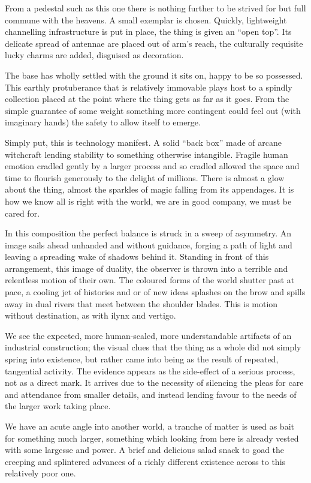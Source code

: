 \documentclass{book}
\begin{document}
From a pedestal such as this one there is nothing further to be strived for but
full commune with the heavens. A small exemplar is chosen. Quickly, lightweight
channelling infrastructure is put in place, the thing is given an ``open top''.
Its delicate spread of antennae are placed out of arm's reach, the culturally
requisite lucky charms are added, disguised as decoration.

The base has wholly settled with the ground it sits on, happy to be so
possessed. This earthly protuberance that is relatively immovable plays host to
a spindly collection placed at the point where the thing gets as far as it
goes. From the simple guarantee of some weight something more contingent could
feel out (with imaginary hands) the safety to allow itself to emerge.

Simply put, this is technology manifest. A solid ``back box'' made of arcane
witchcraft lending stability to something otherwise intangible. Fragile human
emotion cradled gently by a larger process and so cradled allowed the space and
time to flourish generously to the delight of millions. There is almost a glow
about the thing, almost the sparkles of magic falling from its appendages. It
is how we know all is right with the world, we are in good company, we must be
cared for.

In this composition the perfect balance is struck in a sweep of asymmetry. An
image sails ahead unhanded and without guidance, forging a path of light and
leaving a spreading wake of shadows behind it. Standing in front of this
arrangement, this image of duality, the observer is thrown into a terrible and
relentless motion of their own. The coloured forms of the world shutter past at
pace, a cooling jet of histories and or of new ideas splashes on the brow and
spills away in dual rivers that meet between the shoulder blades. This is
motion without destination, as with ilynx and vertigo.

We see the expected, more human-scaled, more understandable artifacts of an
industrial construction; the visual clues that the thing as a whole did not
simply spring into existence, but rather came into being as the result of
repeated, tangential activity. The evidence appears as the side-effect of a
serious process, not as a direct mark. It arrives due to the necessity of
silencing the pleas for care and attendance from smaller details, and instead
lending favour to the needs of the larger work taking place.

We have an acute angle into another world, a tranche of matter is used as bait
for something much larger, something which looking from here is already vested
with some largesse and power. A brief and delicious salad snack to goad the
creeping and splintered advances of a richly different existence across to this
relatively poor one.
\end{document}
